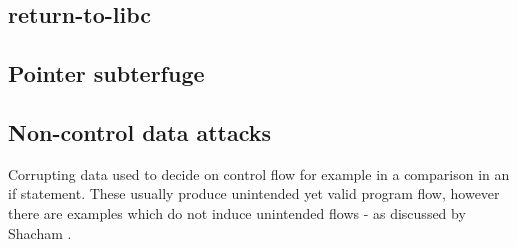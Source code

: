 \subsection{return-to-libc}
\subsection{Pointer subterfuge}
\subsection{Non-control data attacks}
Corrupting data used to decide on control flow for example in a comparison in an if statement. These usually produce unintended yet valid program flow, however there are examples which do not induce unintended flows - as discussed by Shacham \cite{Shacham2007}.